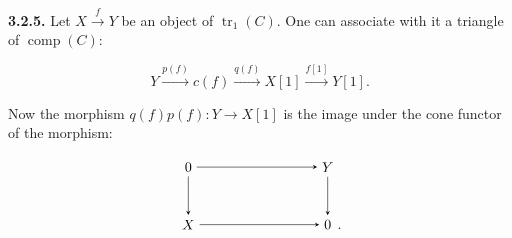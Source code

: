 \noindent\textbf{3.2.5.}\quad
Let $X\xrightarrow{f}Y$ be an object of $\operatorname{tr}_1(C)$. One can
associate with it a triangle of $\operatorname{comp}(C)$:

\begin{equation}
  Y\xrightarrow{p(f)}c(f)\xrightarrow{q(f)}X[1]
  \xrightarrow{f[1]}Y[1].
  \tag{3.2.5.1}
\end{equation}

Now the morphism $q(f)p(f)\colon Y\longrightarrow X[1]$ is the image under the
cone functor of the morphism:

\begin{equation*}
  \begin{tikzpicture}[>=stealth,baseline=(current bounding box.center)]
    \node (Z1) at (0,1.45) {$0$};
    \node (Y)  at (3.5,1.45) {$Y$};
    \node (X)  at (0,0) {$X$};
    \node (Z2) at (3.5,0) {$0$};
    \node[anchor=base west,inner sep=0pt,xshift=.08em] at (Z2.base east) {$.$};
    \draw[->] (Z1) -- (Y);
    \draw[->] (Z1) -- (X);
    \draw[->] (Y) -- (Z2);
    \draw[->] (X) -- (Z2);
  \end{tikzpicture}
\end{equation*}
